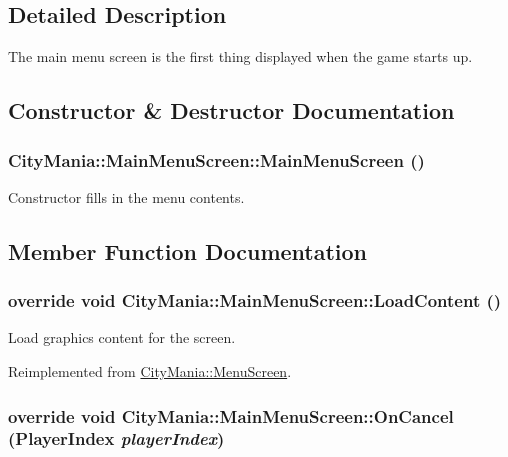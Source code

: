 \subsection{Detailed Description}
The main menu screen is the first thing displayed when the game starts up. 

\subsection{Constructor \& Destructor Documentation}
\hypertarget{classCityMania_1_1MainMenuScreen_a8716594ac7a9fc44ee0b88c57e24674b}{
\subsubsection[{MainMenuScreen}]{\setlength{\rightskip}{0pt plus 5cm}CityMania::MainMenuScreen::MainMenuScreen ()}}
\label{classCityMania_1_1MainMenuScreen_a8716594ac7a9fc44ee0b88c57e24674b}


Constructor fills in the menu contents. 

\subsection{Member Function Documentation}
\hypertarget{classCityMania_1_1MainMenuScreen_a784682ea2036cdefdbbf8ea642f70be0}{
\subsubsection[{LoadContent}]{\setlength{\rightskip}{0pt plus 5cm}override void CityMania::MainMenuScreen::LoadContent ()}}
\label{classCityMania_1_1MainMenuScreen_a784682ea2036cdefdbbf8ea642f70be0}


Load graphics content for the screen. 

Reimplemented from \hyperlink{classCityMania_1_1MenuScreen_ad3892ecccfde65f286cebd1f83083cd1}{CityMania::MenuScreen}.\hypertarget{classCityMania_1_1MainMenuScreen_a46244ba46d101dafbdad93e8a8cb00a2}{
\subsubsection[{OnCancel}]{\setlength{\rightskip}{0pt plus 5cm}override void CityMania::MainMenuScreen::OnCancel (PlayerIndex {\em playerIndex})}}
\label{classCityMania_1_1MainMenuScreen_a46244ba46d101dafbdad93e8a8cb00a2}


